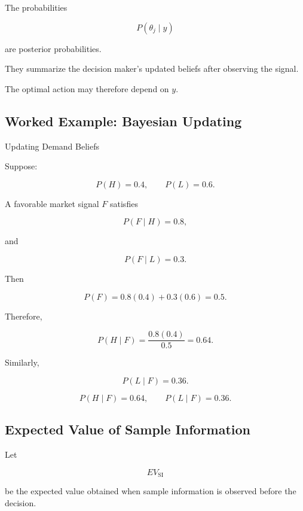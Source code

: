 The probabilities

\[
\boxed{
P(\theta_j\mid y)
}
\]

are posterior probabilities.

They summarize the decision maker's updated beliefs after observing the
signal.

The optimal action may therefore depend on \(y\).

\subsection{Worked Example: Bayesian Updating}
\label{subsec:worked-bayesian-updating}

\begin{workedexamplebox}{Updating Demand Beliefs}

Suppose:

\[
P(H)=0.4,
\qquad
P(L)=0.6.
\]

A favorable market signal \(F\) satisfies

\[
P(F\mid H)=0.8,
\]

and

\[
P(F\mid L)=0.3.
\]

Then

\[
P(F)
=
0.8(0.4)
+
0.3(0.6)
=
0.5.
\]

Therefore,

\[
P(H\mid F)
=
\frac{
0.8(0.4)
}{
0.5
}
=
0.64.
\]

Similarly,

\[
P(L\mid F)
=
0.36.
\]

\begin{answerbox}
\[
\boxed{
P(H\mid F)=0.64,
\qquad
P(L\mid F)=0.36.
}
\]
\end{answerbox}

\end{workedexamplebox}

\subsection{Expected Value of Sample Information}
\label{subsec:evsi}

Let

\[
EV_{\mathrm{SI}}
\]

be the expected value obtained when sample information is observed before
the decision.

